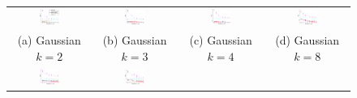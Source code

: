 \documentclass{article}
\begin{document}
\begin{figure}[!t]
  \hspace{-7mm}
  \renewcommand{\tabcolsep}{1pt}
  \begin{tabular}{cccc}
    \includegraphics[width=0.26\textwidth]{../experiment/figure_new/sp_diff_gauss_k_2_view_2-crop} &
    \includegraphics[width=0.26\textwidth]{../experiment/figure_new/sp_diff_gauss_k_3_view_3-crop} &
    \includegraphics[width=0.26\textwidth]{../experiment/figure_new/sp_diff_gauss_k_4_view_1-crop} &
    \includegraphics[width=0.26\textwidth]{../experiment/figure_new/sp_diff_gauss_k_8_view_1-crop} \\
    (a) Gaussian $k=2$ & (b) Gaussian $k=3$ & (c) Gaussian $k=4$ & (d) Gaussian $k=8$ \\
    \includegraphics[width=0.26\textwidth]{../experiment/figure_new/sp_diff_heter_k_2_view_2-crop} &
    \includegraphics[width=0.26\textwidth]{../experiment/figure_new/sp_diff_heter_k_3_view_3-crop} &

\end{tabular}
\end{figure}
\end{document}
